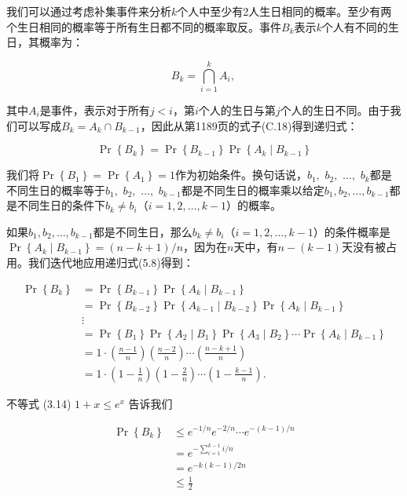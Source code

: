 \documentclass[lang=cn,newtx,10pt,scheme=chinese]{elegantbook}
\begin{document}
我们可以通过考虑补集事件来分析$k$个人中至少有2人生日相同的概率。至少有两个生日相同的概率等于所有生日都不同的概率取反。事件$B_k$表示$k$个人有不同的生日，其概率为：

$$
B_k=\bigcap_{i=1}^k A_i \text {, }
$$

其中$A_i$是事件，表示对于所有$j<i$，第$i$个人的生日与第$j$个人的生日不同。由于我们可以写成$B_k=A_k\cap B_{k-1}$，因此从第1189页的式子(C.18)得到递归式：

$$
\operatorname{Pr}\left\{B_k\right\}=\operatorname{Pr}\left\{B_{k-1}\right\} \operatorname{Pr}\left\{A_k \mid B_{k-1}\right\}
$$

我们将$\operatorname{Pr}\left\{B_1\right\}=\operatorname{Pr}\left\{A_1\right\}=1$作为初始条件。换句话说，$b_1,$ $b_2,$ $\ldots,$ $b_k$都是不同生日的概率等于$b_1,$ $b_2,$ $\ldots,$ $b_{k-1}$都是不同生日的概率乘以给定$b_1, b_2, \ldots, b_{k-1}$都是不同生日的条件下$b_k \neq b_i$（$i=1,2,\ldots,k-1$）的概率。

如果$b_1, b_2, \ldots, b_{k-1}$都是不同生日，那么$b_k \neq b_i$（$i=1,2,\ldots,k-1$）的条件概率是$\operatorname{Pr}\left\{A_k \mid B_{k-1}\right\}=(n-k+1)/n$，因为在$n$天中，有$n-(k-1)$天没有被占用。我们迭代地应用递归式(5.8)得到：

$$
\begin{aligned}
\operatorname{Pr}\left\{B_k\right\} & =\operatorname{Pr}\left\{B_{k-1}\right\} \operatorname{Pr}\left\{A_k \mid B_{k-1}\right\} \\
& =\operatorname{Pr}\left\{B_{k-2}\right\} \operatorname{Pr}\left\{A_{k-1} \mid B_{k-2}\right\} \operatorname{Pr}\left\{A_k \mid B_{k-1}\right\} \\
& \vdots \\
& =\operatorname{Pr}\left\{B_1\right\} \operatorname{Pr}\left\{A_2 \mid B_1\right\} \operatorname{Pr}\left\{A_3 \mid B_2\right\} \cdots \operatorname{Pr}\left\{A_k \mid B_{k-1}\right\} \\
& =1 \cdot\left(\frac{n-1}{n}\right)\left(\frac{n-2}{n}\right) \cdots\left(\frac{n-k+1}{n}\right) \\
& =1 \cdot\left(1-\frac{1}{n}\right)\left(1-\frac{2}{n}\right) \cdots\left(1-\frac{k-1}{n}\right) .
\end{aligned}
$$

不等式 (3.14) $1+x \leq e^x$ 告诉我们

$$
\begin{aligned}
\operatorname{Pr}\left\{B_k\right\} & \leq e^{-1 / n} e^{-2 / n} \cdots e^{-(k-1) / n} \\
& =e^{-\sum_{i=1}^{k-1} i / n} \\
& =e^{-k(k-1) / 2 n} \\
& \leq \frac{1}{2}
\end{aligned}
$$
\end{document}
